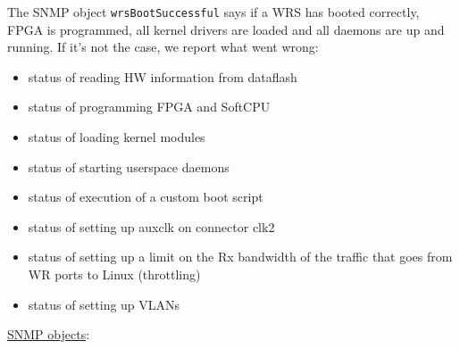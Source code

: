\begin{pck_descr}
				The SNMP object \texttt{wrsBootSuccessful} says if a WRS has booted
				correctly, FPGA is programmed, all kernel drivers are loaded and all
				daemons are up and running. If it's not the case, we report what went
				wrong:
				\begin{itemize}
					\item status of reading HW information from dataflash
					\item status of programming FPGA and SoftCPU
					\item status of loading kernel modules
					\item status of starting userspace daemons
					\item status of execution of a custom boot script
					\item status of setting up auxclk on connector clk2
					\item status of setting up a limit on the Rx bandwidth of the traffic that
					      goes from WR ports to Linux (throttling)
					\item status of setting up VLANs
				\end{itemize}
			\item [] \underline{SNMP objects}:\\
				{\footnotesize
				\\
				\\
				\\
				\\
				\\
				\\
				\\
				\\
				\\
				\\
				\\
				\\
				\\
				\\
				\\
}
\end{pck_descr}
